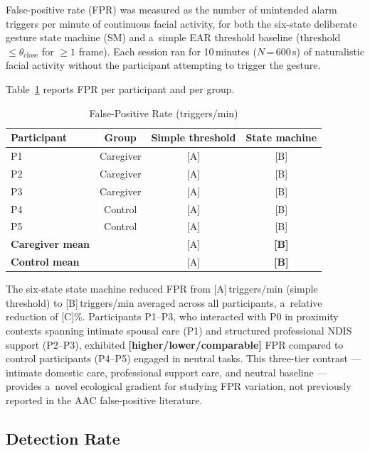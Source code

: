 False-positive rate (FPR) was measured as the number of unintended alarm triggers
per minute of continuous facial activity, for both the six-state deliberate gesture
state machine (SM) and a~simple EAR threshold baseline (threshold $\leq
\theta_\text{close}$ for $\geq 1$ frame). Each session ran for 10\,minutes
($N$\,=\,600\,s) of naturalistic facial activity without the participant attempting
to trigger the gesture.

Table~\ref{tab:fp} reports FPR per participant and per group.

% 
\begin{table}[!t]
  \renewcommand{\arraystretch}{1.15}
  \caption{False-Positive Rate (triggers/min)}
  \label{tab:fp}
  \centering
  \begin{tabular}{lccc}
    \toprule
    Participant & Group & Simple threshold & State machine \\
    \midrule
    P1 & Caregiver & [A] & [B] \\
    P2 & Caregiver & [A] & [B] \\
    P3 & Caregiver & [A] & [B] \\
    P4 & Control   & [A] & [B] \\
    P5 & Control   & [A] & [B] \\
    \midrule
    \textbf{Caregiver mean} & & [A] & \textbf{[B]} \\
    \textbf{Control mean}   & & [A] & \textbf{[B]} \\
    \bottomrule
  \end{tabular}
\end{table}

The six-state state machine reduced FPR from [A]\,triggers/min (simple threshold)
to [B]\,triggers/min averaged across all participants, a~relative reduction of
[C]\%. Participants P1--P3, who interacted with P0 in proximity contexts spanning intimate
spousal care (P1) and structured professional NDIS support (P2--P3), exhibited
\textbf{[higher/lower/comparable]} FPR compared to control participants (P4--P5)
engaged in neutral tasks. This three-tier contrast — intimate domestic care, professional
support care, and neutral baseline — provides a~novel ecological gradient for studying
FPR variation, not previously reported in the AAC false-positive literature.

\subsection{Detection Rate}
\label{sec:detection}

